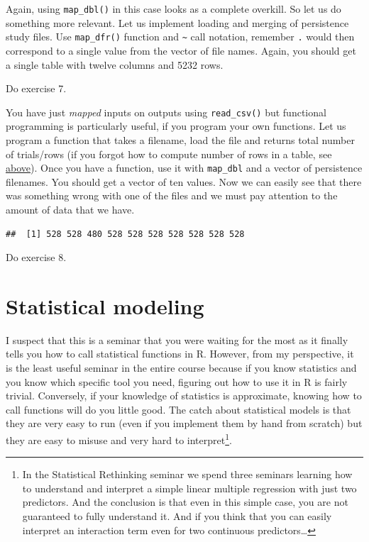 \documentclass[
]{book}
\begin{document}
Again, using \texttt{map\_dbl()} in this case looks as a complete overkill. So let us do something more relevant. Let us implement loading and merging of persistence study files. Use \texttt{map\_dfr()} function and \texttt{\textasciitilde{}} call notation, remember \texttt{.} would then correspond to a single value from the vector of file names. Again, you should get a single table with twelve columns and 5232 rows.

Do exercise 7.

You have just \emph{mapped} inputs on outputs using \texttt{read\_csv()} but functional programming is particularly useful, if you program your own functions. Let us program a function that takes a filename, load the file and returns total number of trials/rows (if you forgot how to compute number of rows in a table, see \protect\hyperlink{forloop}{above}). Once you have a function, use it with \texttt{map\_dbl} and a vector of persistence filenames. You should get a vector of ten values. Now we can easily see that there was something wrong with one of the files and we must pay attention to the amount of data that we have.

\begin{verbatim}
##  [1] 528 528 480 528 528 528 528 528 528 528
\end{verbatim}

Do exercise 8.

\hypertarget{seminar11}{%
\chapter{Statistical modeling}\label{seminar11}}

I suspect that this is a seminar that you were waiting for the most as it finally tells you how to call statistical functions in R. However, from my perspective, it is the least useful seminar in the entire course because if you know statistics and you know which specific tool you need, figuring out how to use it in R is fairly trivial. Conversely, if your knowledge of statistics is approximate, knowing how to call functions will do you little good. The catch about statistical models is that they are very easy to run (even if you implement them by hand from scratch) but they are easy to misuse and very hard to interpret\footnote{In the Statistical Rethinking seminar we spend three seminars learning how to understand and interpret a simple linear multiple regression with just two predictors. And the conclusion is that even in this simple case, you are not guaranteed to fully understand it. And if you think that you can easily interpret an interaction term even for two continuous predictors\ldots{}}.
\end{document}

